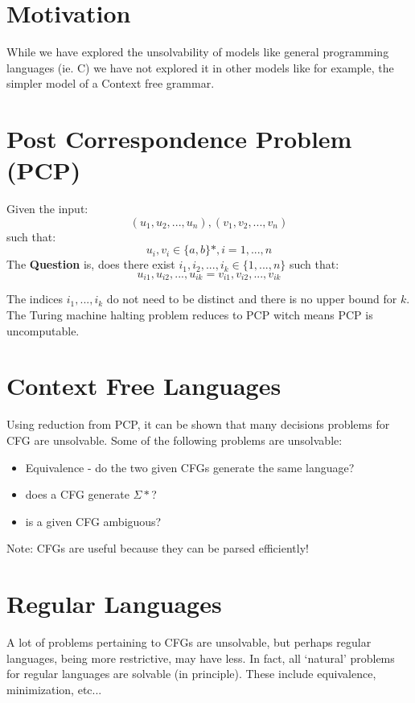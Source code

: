 \documentclass[12pt]{book}
\title{\coursetitle\linebreak\lecturename}
\author{\\Cain Susko\\ 
           \\ \\ \\
      Queen's University 
    \\School of Computing\\}
\begin{document}
\begin{titlepage}
        \maketitle
\end{titlepage}


\section*{Motivation}
While we have explored the unsolvability of models like general programming languages (ie. C) we have
not explored it in other models like for example, the simpler model of a Context free grammar.

\section*{Post Correspondence Problem (PCP)}
Given the input:
\[(u_1, u_2, ..., u_n),(v_1, v_2, ..., v_n)\]
such that:
\[u_i, v_i \in \{a,b\}*, i=1, ..., n\]
The \textbf{Question} is, does there exist $i_1, i_2, ..., i_k \in \{1, ..., n\}$
such that:
\[u_{i1},u_{i2}, ..., u_{ik} = v_{i1},v_{i2}, ..., v_{ik}\]

The indices $i_1, ..., i_k$ do not need to be distinct and there is no upper bound for $k$.
The Turing machine halting problem reduces to PCP witch means PCP is uncomputable.

\section*{Context Free Languages}
Using reduction from PCP, it can be shown that many decisions problems for CFG are unsolvable.
Some of the following problems are unsolvable:
\begin{itemize}
        \item Equivalence - do the two given CFGs generate the same language?
        \item does a CFG generate $\Sigma *$?
        \item is a given CFG ambiguous? 
\end{itemize}

Note: CFGs are useful because they can be parsed efficiently!

\section*{Regular Languages}
A lot of problems pertaining to CFGs are unsolvable, but perhaps regular languages, being more restrictive,
may have less. In fact, all `natural' problems for regular languages are solvable (in principle). These include
equivalence, minimization, etc...
\end{document}

